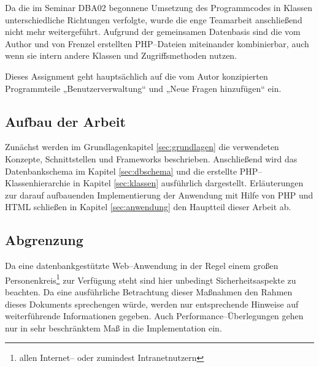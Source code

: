 Da die im Seminar DBA02 begonnene Umsetzung des Programmcodes in Klassen unterschiedliche Richtungen verfolgte, wurde die enge Teamarbeit anschließend nicht mehr weitergeführt. Aufgrund der gemeinsamen Datenbasis sind die vom Author und von Frenzel erstellten PHP--Dateien miteinander kombinierbar, auch wenn sie intern andere Klassen und Zugriffsmethoden nutzen.

Dieses Assignment geht hauptsächlich auf die vom Autor konzipierten Programmteile „Benutzerverwaltung“ und „Neue Fragen hinzufügen“ ein.

\subsection{Aufbau der Arbeit}

Zunächst werden im Grundlagenkapitel \ref{sec:grundlagen} die verwendeten Konzepte, Schnittstellen und Frameworks beschrieben. Anschließend wird das Datenbankschema im Kapitel \ref{sec:dbschema} und die erstellte PHP--Klassenhierarchie in Kapitel \ref{sec:klassen} ausführlich dargestellt. Erläuterungen zur darauf aufbauenden Implementierung der Anwendung mit Hilfe von PHP und HTML schließen in Kapitel \ref{sec:anwendung} den Hauptteil dieser Arbeit ab.

\subsection{Abgrenzung}

Da eine datenbankgestützte Web--Anwendung in der Regel einem großen Personenkreis\footnote{allen Internet-- oder zumindest Intranetnutzern} zur Verfügung steht sind hier unbedingt Sicherheitsaspekte zu beachten. Da eine ausführliche Betrachtung dieser Maßnahmen den Rahmen dieses Dokuments sprechengen würde, werden nur entsprechende Hinweise auf weiterführende Informationen gegeben. Auch Performance--Überlegungen gehen nur in sehr beschränktem Maß in die Implementation ein.
